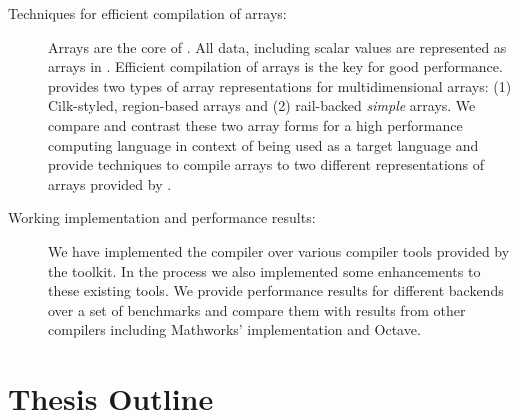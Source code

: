\begin{description}
\item[Techniques for efficient compilation of \matlab arrays:] Arrays are
the core of \matlab. All data, including scalar values are represented
as arrays in \matlab. Efficient compilation of arrays is the key for
good performance. \xten provides two
types of array representations for multidimensional arrays: (1)
Cilk-styled, region-based arrays and (2) rail-backed \emph{simple} arrays. 
We compare
and contrast these two array forms for a high performance computing
language in context of being used as a target language and provide techniques
to compile \matlab arrays to two different representations of arrays provided
by \xten.

\item[Working implementation and performance results:] We have implemented the
\mixten compiler over various \matlab compiler tools provided by the \mclab
toolkit.
In the process we also implemented some enhancements to these existing tools.
We provide performance results for different \xten backends over a set
of benchmarks and compare them with results from other \matlab compilers
including Mathworks' \matlab implementation and Octave.

\end{description}

\section{Thesis Outline}

